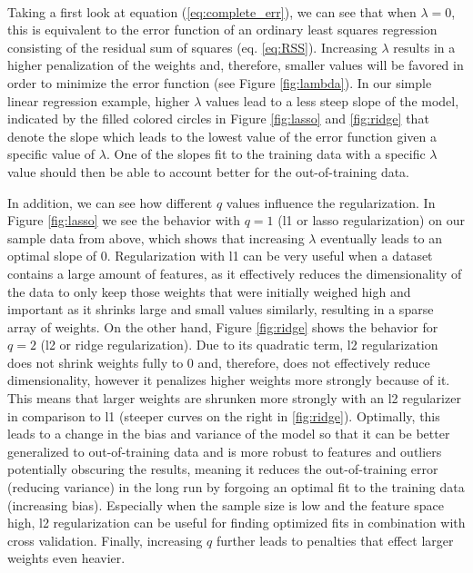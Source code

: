 \documentclass[11pt, a4paper]{article}
\begin{document}
\\
Taking a first look at equation (\ref{eq:complete_err}), we can see that when $\lambda = 0$, this is equivalent to the error function of an ordinary least squares regression consisting of the residual sum of squares (eq. \ref{eq:RSS}). Increasing $\lambda$ results in a higher penalization of the weights and, therefore, smaller values will be favored in order to minimize the error function (see Figure \ref{fig:lambda}). In our simple linear regression example, higher $\lambda$ values lead to a less steep slope of the model, indicated by the filled colored circles in Figure \ref{fig:lasso} and \ref{fig:ridge} that denote the slope which leads to the lowest value of the error function given a specific value of $\lambda$. One of the slopes fit to the training data with a specific $\lambda$ value should then be able to account better for the out-of-training data.

In addition, we can see how different $q$ values influence the regularization. In Figure \ref{fig:lasso} we see the behavior with $q=1$ (l1 or lasso regularization) on our sample data from above, which shows that increasing $\lambda$ eventually leads to an optimal slope of $0$. Regularization with l1 can be very useful when a dataset contains a large amount of features, as it effectively reduces the dimensionality of the data to only keep those weights that were initially weighed high and important as it shrinks large and small values similarly, resulting in a sparse array of weights. On the other hand, Figure \ref{fig:ridge} shows the behavior for $q=2$ (l2 or ridge regularization). Due to its quadratic term, l2 regularization does not shrink weights fully to $0$ and, therefore, does not effectively reduce dimensionality, however it penalizes higher weights more strongly because of it. This means that larger weights are shrunken more strongly with an l2 regularizer in comparison to l1 (steeper curves on the right in \ref{fig:ridge}). Optimally, this leads to a change in the bias and variance of the model so that it can be better generalized to out-of-training data and is more robust to features and outliers potentially obscuring the results, meaning it reduces the out-of-training error (reducing variance) in the long run by forgoing an optimal fit to the training data (increasing bias). Especially when the sample size is low and the feature space high, l2 regularization can be useful for finding optimized fits in combination with cross validation. Finally, increasing $q$ further leads to penalties that effect larger weights even heavier. 
\end{document}
